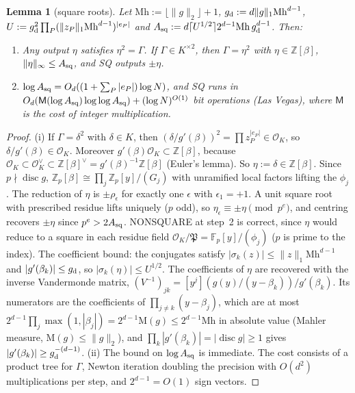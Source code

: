 \documentclass[11pt]{amsart}
\newtheorem{lemma}[theorem]{Lemma}
\theoremstyle{definition}
\newcommand{\Z}{\mathbb{Z}}
\newcommand{\F}{\mathbb{F}}
\newcommand{\cO}{\mathcal{O}}
\newcommand{\fP}{\mathfrak{P}}
\newcommand{\disc}{\operatorname{disc}}
\begin{document}
\begin{lemma}[square roots]\label{lem:SQ}
Let $\mathrm{Mh}:=\lfloor\|g\|_2\rfloor+1$, $g_{\rm d}:=d\|g\|_1\mathrm{Mh}^{d-1}$, $U:=g_{\rm d}^2\prod_P(\|z_P\|_1\mathrm{Mh}^{d-1})^{|e_P|}$ and
$A_{\rm sq}:=d\lceil U^{1/2}\rceil2^{d-1}\mathrm{Mh}\,g_{\rm d}^{d-1}$. Then:
\begin{enumerate}[label=(\roman*)]
\item Any output $\eta$ satisfies $\eta^2=\Gamma$. If $\Gamma\in K^{\times2}$, then $\Gamma=\eta^2$ with $\eta\in\Z[\beta]$, $\|\eta\|_\infty\le A_{\rm sq}$, and SQ outputs $\pm\eta$.
\item $\log A_{\rm sq}=O_d((1+\sum_P|e_P|)\log N)$, and SQ runs in $O_d(\mathsf M(\log A_{\rm sq})\log\log A_{\rm sq})+(\log N)^{O(1)}$ bit operations
  (Las Vegas), where $\mathsf M$ is the cost of integer multiplication.
\end{enumerate}
\end{lemma}

\begin{proof}
(i) If $\Gamma=\delta^2$ with $\delta\in K$, then $(\delta/g'(\beta))^2=\prod z_P^{|e_P|}\in\cO_K$, so $\delta/g'(\beta)\in\cO_K$. Moreover
$g'(\beta)\cO_K\subset\Z[\beta]$, because $\cO_K\subset\cO_K^\vee\subset\Z[\beta]^\vee=g'(\beta)^{-1}\Z[\beta]$ (Euler's lemma). So $\eta:=\delta\in\Z[\beta]$.
Since $p\nmid\disc g$, $\Z_p[\beta]\cong\prod_j\Z_p[y]/(G_j)$ with unramified local factors lifting the $\phi_j$. The reduction of $\eta$ is $\pm\rho_\epsilon$ for exactly
one $\epsilon$ with $\epsilon_1=+1$. A unit square root with prescribed residue lifts uniquely ($p$ odd), so $\eta_\epsilon\equiv\pm\eta\pmod{p^e}$, and centring recovers
$\pm\eta$ since $p^e>2A_{\rm sq}$. NONSQUARE at step~2 is correct, since $\eta$ would reduce to a square in each residue field
$\cO_K/\fP=\F_p[y]/(\phi_j)$ ($p$ is prime to the index). The coefficient bound: the conjugates satisfy $|\sigma_k(z)|\le\|z\|_1\mathrm{Mh}^{d-1}$ and
$|g'(\beta_k)|\le g_{\rm d}$, so $|\sigma_k(\eta)|\le U^{1/2}$. The coefficients of $\eta$ are recovered with the inverse Vandermonde matrix,
$(V^{-1})_{jk}=[y^j](g(y)/(y-\beta_k))/g'(\beta_k)$. Its numerators are the coefficients of $\prod_{j\ne k}(y-\beta_j)$, which are at most $2^{d-1}\prod_j\max(1,|\beta_j|)=2^{d-1}\mathrm{M}(g)\le2^{d-1}\mathrm{Mh}$ in absolute
value (Mahler measure, $\mathrm M(g)\le\|g\|_2$), and
$\prod_k|g'(\beta_k)|=|\disc g|\ge1$ gives $|g'(\beta_k)|\ge g_{\rm d}^{-(d-1)}$. (ii) The bound on $\log A_{\rm sq}$ is immediate. The cost
consists of a product tree for $\Gamma$, Newton iteration doubling the precision with $O(d^2)$ multiplications per step, and $2^{d-1}=O(1)$ sign vectors.
\end{proof}
\end{document}
